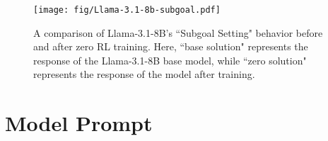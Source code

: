 \begin{figure}[!t]
        \centering
\texttt{[image: fig/Llama-3.1-8b-subgoal.pdf]}
\caption{A comparison of Llama-3.1-8B’s ``Subgoal Setting" behavior before and after zero RL training. Here, ``base solution" represents the response of the Llama-3.1-8B base model,
while ``zero solution" represents the response of the model after training.}
        \label{fig:llama3.1-8b_base_subgoal_setting}
\end{figure}

\section{Model Prompt}
